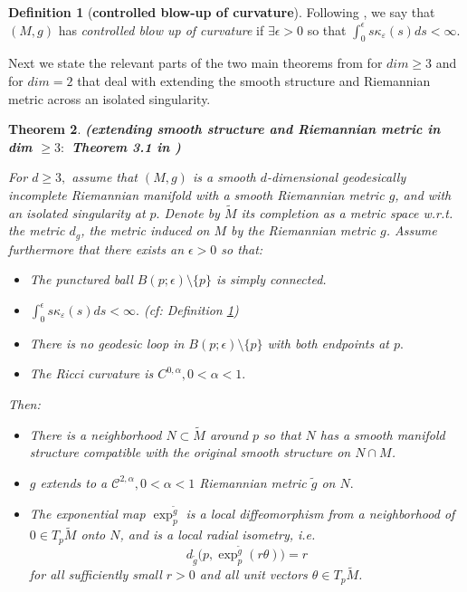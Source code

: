 \documentclass{amsart}
\let\oldcitep\citep
\renewcommand{\citep}[1]{\textcolor{blue}{\oldcitep{#1}}}
\let\oldcitet\citet
\renewcommand{\citet}[1]{\textcolor{blue}{\oldcitet{#1}}}
\newtheorem{theorem}{Theorem}[section]
\theoremstyle{definition}
\newtheorem{definition}[theorem]{Definition}
\theoremstyle{remark}
\newcommand{\nd}{\noindent}
\newcommand{\0}{\boldsymbol{0}}
\def\cC{\mathcal C}
\begin{document}
\begin{definition}[\textbf{controlled blow-up of curvature}]\label{def:controlled-blow-up of curvature}
    Following \citet{SmithYang1992}, we say that $(M,g)$ has \textit{controlled blow up of curvature} if $\exists \epsilon >0$ so that $\int_{0}^{\epsilon}s\kappa_{\varepsilon}(s)ds<\infty.$
\end{definition}



\nd Next we state the relevant parts of the two main theorems from \citep{SmithYang1992} for $dim\ge 3$ and for $dim=2$ that deal with extending the smooth structure and Riemannian metric across an isolated singularity.

\begin{theorem}\label{extending smooth structure and metric for dim 3}\textbf{(extending smooth structure and Riemannian metric in dim $\ge 3:$ Theorem 3.1 in \citep{SmithYang1992})}


\nd For $d\ge 3,$ assume that $(M,g)$ is a smooth $d$-dimensional geodesically incomplete Riemannian manifold with a smooth Riemannian metric $g$, and with an isolated singularity at $p.$ Denote by $\widetilde{M}$ its completion as a metric space w.r.t. the metric $d_g$, the metric induced on $M$ by the Riemannian metric $g$. Assume furthermore that there exists an $\epsilon >0$ so that:
 
\begin{itemize}
    \item The punctured ball $B(p;\epsilon)\setminus \{p\}$ is simply connected.
    \item $\int_{0}^{\epsilon}s\kappa_{\varepsilon}(s)ds < \infty.$ (cf: Definition \ref{def:controlled-blow-up of curvature})
    \item There is no geodesic loop in $B(p;\epsilon)\setminus \{p\}$ with both endpoints at $p.$
    \item The Ricci curvature is $C^{0,\alpha}, 0 < \alpha < 1.$
\end{itemize}

\nd Then:
\begin{itemize}
    \item There is a neighborhood $N\subset \widetilde{M}$ around $p$ so that $N$ has a smooth manifold structure compatible with the original smooth structure on \(N\cap M\).
    \item $g$ extends to a $\cC^{2,\alpha}, 0 < \alpha < 1$ Riemannian metric $\tilde{g}$ on $N.$
    \item The exponential map $\exp^{\tilde g}_p$ is a local diffeomorphism from a neighborhood of $0\in T_p\widetilde M$ onto $N$, and is a local radial isometry, i.e.
\[
d_{\tilde g}\bigl(p,\exp^{\tilde g}_p(r\theta)\bigr)=r
\]
for all sufficiently small $r>0$ and all unit vectors $\theta\in T_p\widetilde M$.
\end{itemize}
  
\end{theorem}
\end{document}
